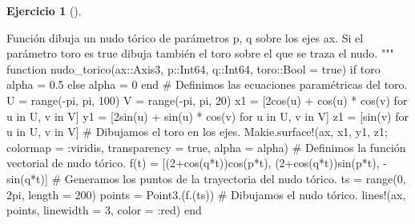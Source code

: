 \documentclass[
  a4paper,
]{scrreport}
\newenvironment{Shaded}{\begin{snugshade}}{\end{snugshade}}
\newcommand{\CommentTok}[1]{\textcolor[rgb]{0.37,0.37,0.37}{#1}}
\newcommand{\ConstantTok}[1]{\textcolor[rgb]{0.56,0.35,0.01}{#1}}
\newcommand{\ControlFlowTok}[1]{\textcolor[rgb]{0.00,0.23,0.31}{#1}}
\newcommand{\DataTypeTok}[1]{\textcolor[rgb]{0.68,0.00,0.00}{#1}}
\newcommand{\FloatTok}[1]{\textcolor[rgb]{0.68,0.00,0.00}{#1}}
\newcommand{\FunctionTok}[1]{\textcolor[rgb]{0.28,0.35,0.67}{#1}}
\newcommand{\KeywordTok}[1]{\textcolor[rgb]{0.00,0.23,0.31}{#1}}
\newcommand{\NormalTok}[1]{\textcolor[rgb]{0.00,0.23,0.31}{#1}}
\newcommand{\OperatorTok}[1]{\textcolor[rgb]{0.37,0.37,0.37}{#1}}
\newcommand{\StringTok}[1]{\textcolor[rgb]{0.13,0.47,0.30}{#1}}
\theoremstyle{definition}
\newtheorem{exercise}{Ejercicio}[chapter]
\theoremstyle{remark}
\begin{document}
\begin{exercise}[]
\begin{enumerate}
\begin{tcolorbox}
\begin{Shaded}
\begin{Highlighting}[]
\StringTok{Función dibuja un nudo tórico de parámetros p, q sobre los ejes ax. Si el parámetro toro es true dibuja también el toro sobre el que se traza el nudo.}
\StringTok{"""}
\KeywordTok{function} \FunctionTok{nudo\_torico}\NormalTok{(ax}\OperatorTok{::}\DataTypeTok{Axis3}\NormalTok{, p}\OperatorTok{::}\DataTypeTok{Int64}\NormalTok{, q}\OperatorTok{::}\DataTypeTok{Int64}\NormalTok{, toro}\OperatorTok{::}\DataTypeTok{Bool }\OperatorTok{=} \ConstantTok{true}\NormalTok{)}
    \ControlFlowTok{if}\NormalTok{ toro }
\NormalTok{        alpha }\OperatorTok{=} \FloatTok{0.5}
    \ControlFlowTok{else}
\NormalTok{        alpha }\OperatorTok{=} \FloatTok{0}
    \ControlFlowTok{end}
    \CommentTok{\# Definimos las ecuaciones paramétricas del toro.}
\NormalTok{    U }\OperatorTok{=} \FunctionTok{range}\NormalTok{(}\OperatorTok{{-}}\ConstantTok{pi}\NormalTok{, }\ConstantTok{pi}\NormalTok{, }\FloatTok{100}\NormalTok{)}
\NormalTok{    V }\OperatorTok{=} \FunctionTok{range}\NormalTok{(}\OperatorTok{{-}}\ConstantTok{pi}\NormalTok{, }\ConstantTok{pi}\NormalTok{, }\FloatTok{20}\NormalTok{)}
\NormalTok{    x1 }\OperatorTok{=}\NormalTok{ [}\FloatTok{2}\FunctionTok{cos}\NormalTok{(u) }\OperatorTok{+} \FunctionTok{cos}\NormalTok{(u) }\OperatorTok{*} \FunctionTok{cos}\NormalTok{(v) for u }\KeywordTok{in}\NormalTok{ U, v }\KeywordTok{in}\NormalTok{ V]}
\NormalTok{    y1 }\OperatorTok{=}\NormalTok{ [}\FloatTok{2}\FunctionTok{sin}\NormalTok{(u) }\OperatorTok{+} \FunctionTok{sin}\NormalTok{(u) }\OperatorTok{*} \FunctionTok{cos}\NormalTok{(v) for u }\KeywordTok{in}\NormalTok{ U, v }\KeywordTok{in}\NormalTok{ V]}
\NormalTok{    z1 }\OperatorTok{=}\NormalTok{ [}\FunctionTok{sin}\NormalTok{(v) for u }\KeywordTok{in}\NormalTok{ U, v }\KeywordTok{in}\NormalTok{ V]}
    \CommentTok{\# Dibujamos el toro en los ejes.}
\NormalTok{    Makie.}\FunctionTok{surface!}\NormalTok{(ax, x1, y1, z1; colormap }\OperatorTok{=} \OperatorTok{:}\NormalTok{viridis, transparency }\OperatorTok{=} \ConstantTok{true}\NormalTok{, alpha }\OperatorTok{=}\NormalTok{ alpha)}
    \CommentTok{\# Definimos la función vectorial de nudo tórico.}
    \FunctionTok{f}\NormalTok{(t) }\OperatorTok{=}\NormalTok{ [(}\FloatTok{2}\FunctionTok{+cos}\NormalTok{(q}\OperatorTok{*}\NormalTok{t))}\FunctionTok{cos}\NormalTok{(p}\OperatorTok{*}\NormalTok{t), (}\FloatTok{2}\FunctionTok{+cos}\NormalTok{(q}\OperatorTok{*}\NormalTok{t))}\FunctionTok{sin}\NormalTok{(p}\OperatorTok{*}\NormalTok{t), }\FunctionTok{{-}sin}\NormalTok{(q}\OperatorTok{*}\NormalTok{t)] }
    \CommentTok{\# Generamos los puntos de la trayectoria del nudo tórico.}
\NormalTok{    ts }\OperatorTok{=} \FunctionTok{range}\NormalTok{(}\FloatTok{0}\NormalTok{, }\FloatTok{2}\NormalTok{pi, length }\OperatorTok{=} \FloatTok{200}\NormalTok{)}
\NormalTok{    points }\OperatorTok{=} \FunctionTok{Point3}\NormalTok{.(}\FunctionTok{f}\NormalTok{.(ts))}
    \CommentTok{\# Dibujamos el nudo tórico.}
    \FunctionTok{lines!}\NormalTok{(ax, points, linewidth }\OperatorTok{=} \FloatTok{3}\NormalTok{, color }\OperatorTok{=} \OperatorTok{:}\NormalTok{red)}
\KeywordTok{end}


\end{Highlighting}
\end{Shaded}
\end{tcolorbox}
\end{enumerate}
\end{exercise}
\end{document}
